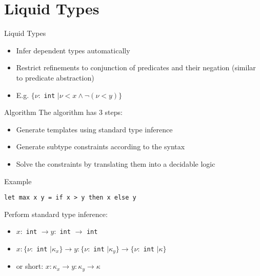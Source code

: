 \documentclass[pdf]{beamer}
\begin{document}
\section{Liquid Types}

\begin{frame}{Liquid Types}
  \begin{itemize}
    \item<+-> Infer dependent types automatically
    \item<+-> Restrict refinements to conjunction of predicates and their negation (similar to predicate abstraction)
    \item<+-> E.g. $\{\nu:$ \texttt{int} $\mid \nu < x \land \neg(\nu < y)\}$
  \end{itemize}
\end{frame}

\begin{frame}{Algorithm}
  The algorithm has 3 steps:
  \begin{itemize}
    \item<+->[1)] Generate templates using standard type inference
    \item<+->[2)] Generate subtype constraints according to the syntax
    \item<+->[3)] Solve the constraints by translating them into a decidable logic
  \end{itemize}
\end{frame}

\begin{frame}[fragile]{Example}
  \begin{verbatim}
let max x y = if x > y then x else y
  \end{verbatim}
  \pause
  Perform standard type inference:
  \begin{itemize}
    \item<+-> $x:$ \texttt{int} $\rightarrow y:$ \texttt{int} $\rightarrow$ \texttt{int}
    \item<+-> $x: \{\nu:$ \texttt{int} $\mid \kappa_x\} \rightarrow y: \{\nu:$ \texttt{int} $\mid \kappa_y\} \rightarrow \{\nu:$ \texttt{int} $\mid \kappa\}$
    \item<+-> or short: $x: \kappa_x \rightarrow y: \kappa_y \rightarrow \kappa$
  \end{itemize}
\end{frame}
\end{document}
